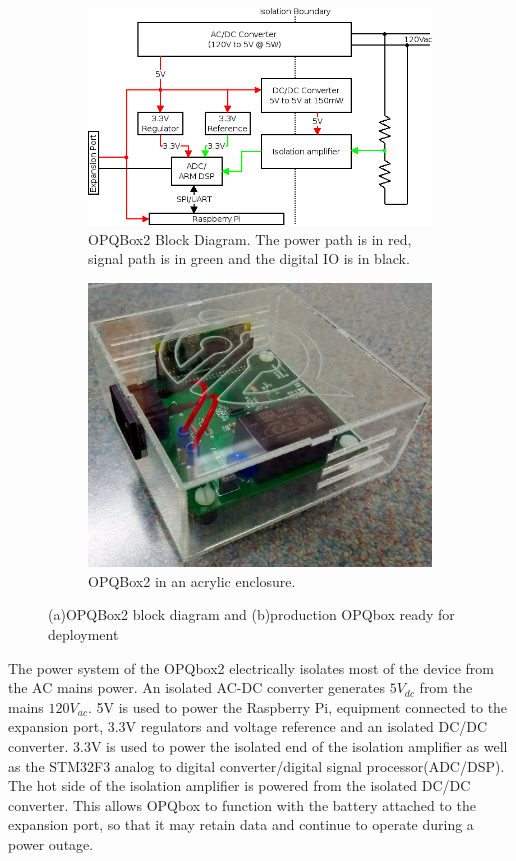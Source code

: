 \begin{figure}[h]
	\centering
	\begin{subfigure}{.5\textwidth}
	  \centering
	  \includegraphics[width=0.9\linewidth]{img/opqbox_diagram.png}
	  \caption{OPQBox2 Block Diagram. The power path is in red, signal path is in green and the digital IO is in black.}
	  \label{fig2:sub1}
	\end{subfigure}%
	\begin{subfigure}{.5\textwidth}
	  \centering
	  \includegraphics[width=0.7\linewidth]{img/opqbox_photo.jpg}
	  \caption{OPQBox2 in an acrylic enclosure.}
	  \label{fig2:sub2}
	\end{subfigure}
	\caption{(a)OPQBox2 block diagram and (b)production OPQbox ready for deployment}
	\label{fig:2}
\end{figure}

The power system of the OPQbox2 electrically isolates most of the device from the AC mains power. An isolated AC-DC converter generates $5V_{dc}$ from the mains $120V_{ac}$. 5V is used to power the Raspberry Pi, equipment connected to the expansion port, 3.3V regulators and voltage reference and an isolated DC/DC converter. 3.3V is used to power the isolated end of the isolation amplifier as well as the STM32F3 analog to digital converter/digital signal processor(ADC/DSP). The hot side of the isolation amplifier is powered from the isolated DC/DC converter. This allows OPQbox to function with the battery attached to the expansion port, so that it may retain data and continue to operate during a power outage. 

